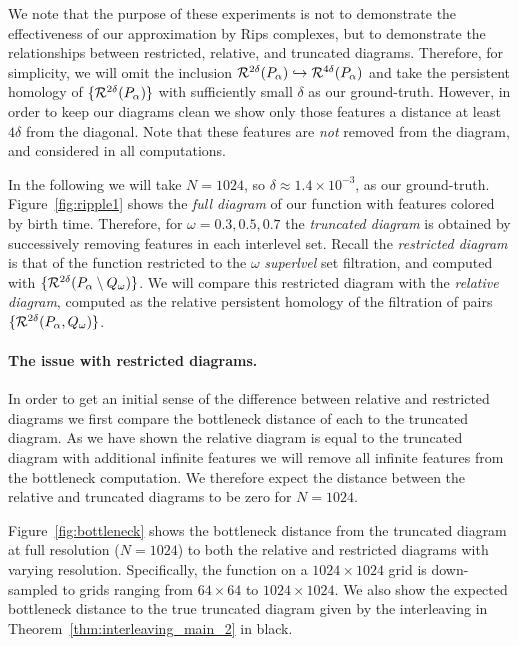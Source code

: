 We note that the purpose of these experiments is not to demonstrate the effectiveness of our approximation by Rips complexes, but to demonstrate the relationships between restricted, relative, and truncated diagrams.
Therefore, for simplicity, we will omit the inclusion $\mathcal{R}^{2\delta}(P_\alpha)\hookrightarrow\mathcal{R}^{4\delta}(P_\alpha)$ and take the persistent homology of $\{\mathcal{R}^{2\delta}(P_\alpha)\}$ with sufficiently small $\delta$ as our ground-truth.
However, in order to keep our diagrams clean we show only those features a distance at least $4\delta$ from the diagonal.
Note that these features are \emph{not} removed from the diagram, and considered in all computations.

In the following we will take $N = 1024$, so $\delta\approx 1.4\times 10^{-3}$, as our ground-truth.
Figure~\ref{fig:ripple1} shows the \emph{full diagram} of our function with features colored by birth time.
Therefore, for $\omega = 0.3, 0.5, 0.7$ the \emph{truncated diagram} is obtained by successively removing features in each interlevel set.
Recall the \emph{restricted diagram} is that of the function restricted to the $\omega$ \emph{superlvel} set filtration, and computed with $\{\mathcal{R}^{2\delta}(P_\alpha\setminus Q_\omega)\}$.
We will compare this restricted diagram with the \emph{relative diagram}, computed as the relative persistent homology of the filtration of pairs $\{\mathcal{R}^{2\delta}(P_\alpha, Q_\omega)\}$.

\paragraph*{The issue with restricted diagrams.}

In order to get an initial sense of the difference between relative and restricted diagrams we first compare the bottleneck distance of each to the truncated diagram.
As we have shown the relative diagram is equal to the truncated diagram with additional infinite features we will remove all infinite features from the bottleneck computation.
We therefore expect the distance between the relative and truncated diagrams to be zero for $N=1024$.

Figure~\ref{fig:bottleneck} shows the bottleneck distance from the truncated diagram at full resolution ($N = 1024$) to both the relative and restricted diagrams with varying resolution.
Specifically, the function on a $1024\times 1024$ grid is down-sampled to grids ranging from $64\times 64$ to $1024\times 1024$.
We also show the expected bottleneck distance to the true truncated diagram given by the interleaving in Theorem~\ref{thm:interleaving_main_2} in black.

